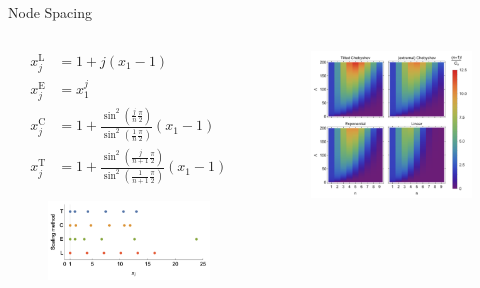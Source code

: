 \documentclass[11pt,aspectratio=1610,xcolor=dvipsnames]{beamer}
\begin{document}
\begin{frame}{Node Spacing}

	\begin{columns}
		\begin{column}{0.5\textwidth}
			\begin{align*}
				x_j^\mathrm{L} & = 1 + j(x_1 - 1)                                                                             \\
				x_j^\mathrm{E} & = x_1^j                                                                                      \\
				x_j^\mathrm{C} & = 1 + \frac{\sin^2(\frac{j}{n}\frac{\pi}{2})}{\sin^2(\frac{1}{n}\frac{\pi}{2})}(x_1 - 1)     \\
				x_j^\mathrm{T} & = 1 + \frac{\sin^2(\frac{j}{n+1}\frac{\pi}{2})}{\sin^2(\frac{1}{n+1}\frac{\pi}{2})}(x_1 - 1)
			\end{align*}
			\begin{figure}[h]
				\centering
				\includegraphics[width=\textwidth]{spacing.png}
			\end{figure}
		\end{column}
		\begin{column}{0.5\textwidth}
			\begin{figure}[h]
				\centering
				\includegraphics[width=\textwidth]{spacing-quality.png}
			\end{figure}
		\end{column}
	\end{columns}


\end{frame}
\end{document}
